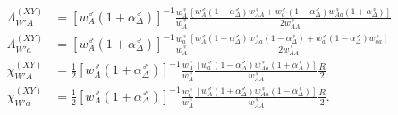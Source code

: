 \documentclass[10pt,letterpaper]{article}
\begin{document}
\begin{subequations}\label{Binvasion}
\begin{align}
\Lambda_{W'A}^{(XY)}&= {\left[w_{A}^\male (1+\alpha^\male_\Delta) \right]}^{-1}
\frac{w_{A}^\female }{w_{A}^\female}
\frac{\left[ w_{A}^\male (1+\alpha^\male_\Delta) w_{AA}^\female + 
w_{a}^\male (1-\alpha^\male_\Delta) w_{Aa}^\female (1+\alpha^\female_\Delta) \right]}
{ 2w_{AA}^\female } \\
\Lambda_{W'a}^{(XY)}&= {\left[w_{A}^\male (1+\alpha^\male_\Delta) \right]}^{-1}
\frac{w_{a}^\female}{w_{A}^\female}
\frac{\left[  w_{A}^\male (1+\alpha^\male_\Delta) w_{Aa}^\female (1-\alpha^\female_\Delta)+
w_{a}^\male (1-\alpha^\male_\Delta) w_{aa}^\female \right]}
{ 2w_{AA}^\female } \\
\chi_{W'A}^{(XY)}&= \frac{1}{2} {\left[w_{A}^\male (1+\alpha^\male_\Delta) \right]}^{-1}
\frac{w_{A}^\female }{w_{A}^\female}
 \frac{\left[  w_{a}^\male (1-\alpha^\male_\Delta) w_{Aa}^\female (1 + \alpha^\female_\Delta) \right]}
{ w_{AA}^\female } \frac{R}{2}\\
\chi_{W'a}^{(XY)}&= \frac{1}{2} {\left[w_{A}^\male (1+\alpha^\male_\Delta) \right]}^{-1}
\frac{w_{a}^\female}{w_{A}^\female}
 \frac{\left[  w_{A}^\male (1+\alpha^\male_\Delta) w_{Aa}^\female (1-\alpha^\female_\Delta) \right]}
{  w_{AA}^\female} \frac{R}{2}.
\end{align}
\end{subequations}
\end{document}
